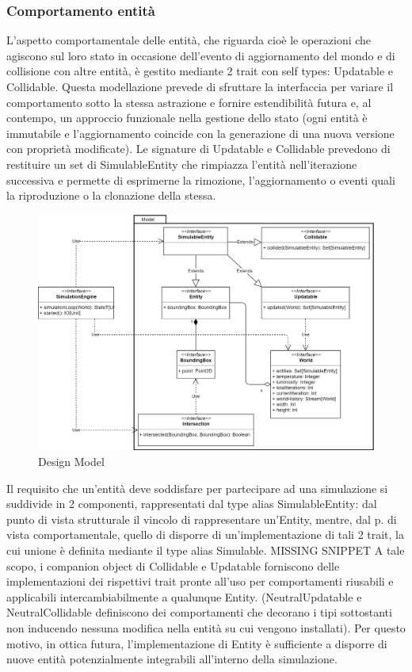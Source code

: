\subsubsection{Comportamento entità}
L’aspetto comportamentale delle entità, che riguarda cioè le operazioni che agiscono sul loro stato in occasione dell’evento di aggiornamento del mondo e di collisione con altre entità, è gestito mediante 2 trait con self types: Updatable e Collidable. Questa modellazione prevede di sfruttare la interfaccia per variare il comportamento sotto la stessa astrazione e fornire estendibilità futura e, al contempo, un approccio funzionale nella gestione dello stato (ogni entità è immutabile e l’aggiornamento coincide con la generazione di una nuova versione con proprietà modificate). Le signature di Updatable e Collidable prevedono di restituire un set di SimulableEntity che rimpiazza l’entità nell’iterazione successiva e permette di esprimerne la rimozione, l’aggiornamento o eventi quali la riproduzione o la clonazione della stessa.
\begin{figure}[h!]
\centering
\includegraphics[width=\textwidth, scale=0.14]{img/Model.png}
\caption{Design Model}
\label{fig:model}
\end{figure}
Il requisito che un’entità deve soddisfare per partecipare ad una simulazione si suddivide in 2 componenti, rappresentati dal type alias SimulableEntity: dal punto di vista strutturale il vincolo di rappresentare un’Entity, mentre, dal p. di vista comportamentale, quello di disporre di un’implementazione di tali 2 trait, la cui unione è definita mediante il type alias Simulable. 
MISSING SNIPPET
A tale scopo, i companion object di Collidable e Updatable forniscono delle implementazioni dei rispettivi trait pronte all’uso per comportamenti riusabili e applicabili intercambiabilmente a qualunque Entity. (NeutralUpdatable e NeutralCollidable definiscono dei comportamenti che decorano i tipi sottostanti non inducendo nessuna modifica nella entità su cui vengono installati). Per questo motivo, in ottica futura, l’implementazione di Entity è sufficiente a disporre di nuove entità potenzialmente integrabili all’interno della simulazione.


